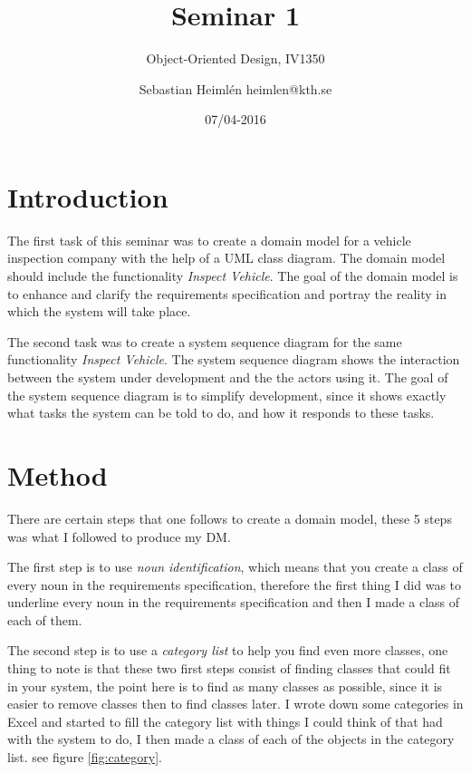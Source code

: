 \documentclass[a4paper]{scrreprt}
\title{Seminar 1}
\subtitle{Object-Oriented Design, IV1350}
\author{Sebastian Heimlén heimlen@kth.se}
\date{07/04-2016}
\begin{document}
\maketitle

\tableofcontents %

\chapter{Introduction}

The first task of this seminar was to create a domain model for a vehicle inspection company with the help of a UML class diagram. The domain model should include the functionality \textit{Inspect Vehicle}. The goal of the domain model is to enhance and clarify the requirements specification and portray the reality in which the system will take place.

The second task was to create a system sequence diagram for the same functionality \textit{Inspect Vehicle}. The system sequence diagram shows the interaction between the system under development and the the actors using it. The goal of the system sequence diagram is to simplify development, since  it shows exactly what tasks the system can be told to do, and how it responds to these tasks.

\chapter{Method}

There are certain steps that one follows to create a domain model, these 5 steps was what I followed to produce my DM.

The first step is to use \textit{noun identification}, which means that you create a class of every noun in the requirements specification, therefore the first thing I did was to underline every noun in the requirements specification and then I made a class of each of them.

The second step is to use a \textit{category list} to help you find even more classes, one thing to note is that these two first steps consist of finding classes that could fit in your system, the point here is to find as many classes as possible, since it is easier to remove classes then to find classes later. I wrote down some categories in Excel and started to fill the category list with things I could think of that had with the system to do, I then made a class of each of the objects in the category list. see figure \ref{fig:category}.
\end{document}
